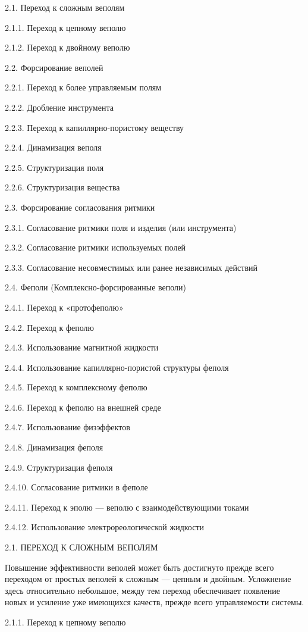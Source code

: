 2.1. Переход к сложным веполям

2.1.1. Переход к цепному веполю

2.1.2. Переход к двойному веполю

2.2. Форсирование веполей

2.2.1. Переход к более управляемым полям

2.2.2. Дробление инструмента

2.2.3. Переход к капиллярно-пористому веществу

2.2.4. Динамизация веполя

2.2.5. Структуризация поля

2.2.6. Структуризация вещества

2.3. Форсирование согласования ритмики

2.3.1. Согласование ритмики поля и изделия
(или инструмента)

2.3.2. Согласование ритмики используемых полей

2.3.3. Согласование несовместимых или ранее
независимых действий

2.4. Феполи (Комплексно-форсированные веполи)

2.4.1. Переход к «протофеполю»

2.4.2. Переход к феполю

2.4.3. Использование магнитной жидкости

2.4.4. Использование капиллярно-пористой структуры
феполя

2.4.5. Переход к комплексному феполю

2.4.6. Переход к феполю на внешней среде

2.4.7. Использование физэффектов

2.4.8. Динамизация феполя

2.4.9. Структуризация феполя

2.4.10. Согласование ритмики в феполе

2.4.11. Переход к эполю — веполю с взаимодействующими токами

2.4.12. Использование электрореологической жидкости


2.1. ПЕРЕХОД К СЛОЖНЫМ ВЕПОЛЯМ


Повышение  эффективности веполей  может быть  достигнуто прежде  всего
переходом от простых веполей к  сложным — цепным и двойным. Усложнение
здесь относительно небольшое, между тем переход обеспечивает появление
новых  и усиление  уже имеющихся  качеств, прежде  всего управляемости
системы.

2.1.1. Переход к цепному веполю

